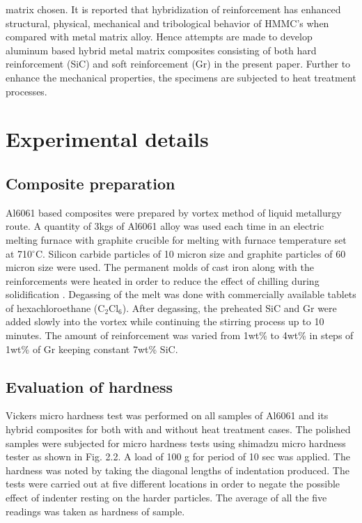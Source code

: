 \documentclass[10pt,a4paper]{article}
\numberwithin{figure}{section}
\numberwithin{table}{section}
\begin{document}
matrix chosen. It is reported that hybridization of  reinforcement has enhanced structural, physical, mechanical and tribological behavior of HMMC's  when compared with metal matrix alloy\cite{rar5}. Hence attempts are made to develop aluminum based hybrid metal matrix composites consisting of both hard reinforcement (SiC) and soft reinforcement (Gr) in the present paper. Further to enhance the mechanical properties, the specimens are subjected to heat treatment processes.


\section{Experimental details}



\subsection{Composite preparation}

Al6061 based composites were prepared by vortex method of liquid metallurgy route. A quantity of 3kgs of Al6061 alloy was used each time in an electric melting furnace with graphite crucible for melting with furnace temperature set at 710$^\circ$C. Silicon carbide particles of 10 micron size and graphite particles of 60 micron size were used. The permanent molds of cast iron along with the reinforcements were heated in order to reduce the effect of chilling during solidification \cite{rar7,rar6}   . Degassing of the melt was done with commercially available tablets of hexachloroethane (C$_2$Cl$_6$). After degassing, the preheated SiC and Gr were added slowly into the vortex while continuing the stirring process up to 10 minutes. The amount of reinforcement was varied from 1wt\% to 4wt\% in steps of 1wt\% of Gr keeping constant 7wt\% SiC.



\subsection{Evaluation of hardness}

Vickers micro hardness test was performed on all samples of Al6061 and its hybrid composites for both with and without heat treatment cases. The polished samples were subjected for micro hardness tests using shimadzu micro hardness tester as shown in Fig. 2.2. A load of 100 g for period of 10 sec was applied. The hardness was noted by taking the diagonal lengths of indentation produced.
The tests were carried out at five different locations in order to negate the possible effect of indenter resting on the harder particles. The average of all the five readings was taken as hardness of sample.
\end{document}
